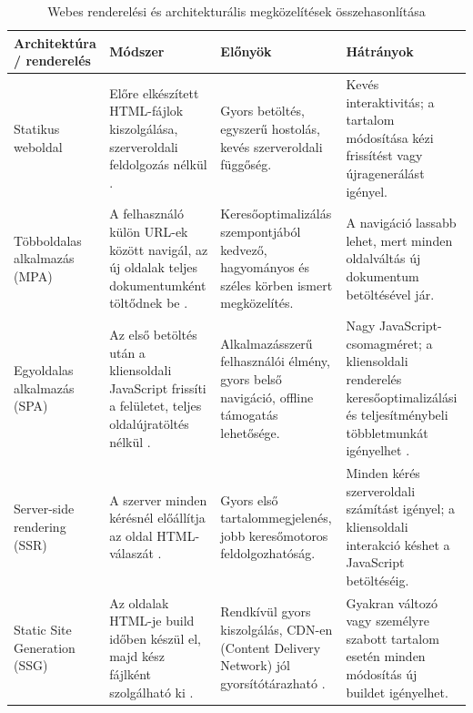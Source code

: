 \begin{table}[H]
\centering
\small
\setlength{\tabcolsep}{3pt}
\renewcommand{\arraystretch}{1.25}
\begin{tabular}{|p{}|p{}|p{}|p{}|}
\hline
\textbf{Architektúra / renderelés} & \textbf{Módszer} & \textbf{Előnyök} & \textbf{Hátrányok} \\
\hline
Statikus weboldal & Előre elkészített HTML-fájlok kiszolgálása, szerveroldali feldolgozás nélkül \cite{mdnWebServer}. & Gyors betöltés, egyszerű hostolás, kevés szerveroldali függőség. & Kevés interaktivitás; a tartalom módosítása kézi frissítést vagy újragenerálást igényel. \\
\hline
Többoldalas alkalmazás (MPA) & A felhasználó külön URL-ek között navigál, az új oldalak teljes dokumentumként töltődnek be \cite{webdevPwaArchitecture}. & Keresőoptimalizálás szempontjából kedvező, hagyományos és széles körben ismert megközelítés. & A navigáció lassabb lehet, mert minden oldalváltás új dokumentum betöltésével jár. \\
\hline
Egyoldalas alkalmazás (SPA) & Az első betöltés után a kliensoldali JavaScript frissíti a felületet, teljes oldalújratöltés nélkül \cite{mdnSpa}. & Alkalmazásszerű felhasználói élmény, gyors belső navigáció, offline támogatás lehetősége. & Nagy JavaScript-csomagméret; a kliensoldali renderelés keresőoptimalizálási és teljesítménybeli többletmunkát igényelhet \cite{webdevRenderingOnWeb}. \\
\hline
Server-side rendering (SSR) & A szerver minden kérésnél előállítja az oldal HTML-válaszát \cite{webdevRenderingOnWeb}. & Gyors első tartalommegjelenés, jobb keresőmotoros feldolgozhatóság. & Minden kérés szerveroldali számítást igényel; a kliensoldali interakció késhet a JavaScript betöltéséig. \\
\hline
Static Site Generation (SSG) & Az oldalak HTML-je build időben készül el, majd kész fájlként szolgálható ki \cite{webdevRenderingOnWeb}. & Rendkívül gyors kiszolgálás, CDN-en (Content Delivery Network) jól gyorsítótárazható \cite{cloudflareCdnEdgeServer}. & Gyakran változó vagy személyre szabott tartalom esetén minden módosítás új buildet igényelhet. \\
\hline
\end{tabular}
\caption{Webes renderelési és architekturális megközelítések összehasonlítása}
\label{tab:web-rendering-architectures}
\end{table}
